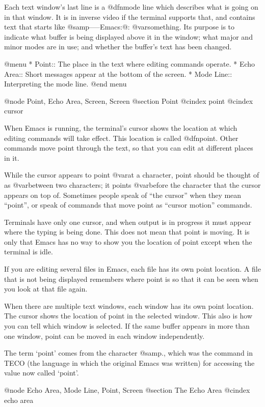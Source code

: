   Each text window's last line is a @dfn{mode line} which describes what is
going on in that window.  It is in inverse video if the terminal supports
that, and contains text that starts like @samp{-----Emacs:@: @var{something}}.  Its
purpose is to indicate what buffer is being displayed above it in the
window; what major and minor modes are in use; and whether the buffer's
text has been changed.

@menu
* Point::	The place in the text where editing commands operate.
* Echo Area::   Short messages appear at the bottom of the screen.
* Mode Line::	Interpreting the mode line.
@end menu

@node Point, Echo Area, Screen, Screen
@section Point
@cindex point
@cindex cursor

  When Emacs is running, the terminal's cursor shows the location at
which editing commands will take effect.  This location is called
@dfn{point}.  Other commands move point through the text, so that you
can edit at different places in it.

  While the cursor appears to point @var{at} a character, point should be
thought of as @var{between} two characters; it points @var{before} the character
that the cursor appears on top of.  Sometimes people speak of ``the
cursor'' when they mean ``point'', or speak of commands that move point as
``cursor motion'' commands.

  Terminals have only one cursor, and when output is in progress it must
appear where the typing is being done.  This does not mean that point is
moving.  It is only that Emacs has no way to show you the location of point
except when the terminal is idle.

  If you are editing several files in Emacs, each file has its own point
location.  A file that is not being displayed remembers where point is so
that it can be seen when you look at that file again.

  When there are multiple text windows, each window has its own point
location.  The cursor shows the location of point in the selected window.
This also is how you can tell which window is selected.  If the same buffer
appears in more than one window, point can be moved in each window
independently.

  The term `point' comes from the character @samp{.}, which was the
command in TECO (the language in which the original Emacs was written)
for accessing the value now called `point'.

@node Echo Area, Mode Line, Point, Screen
@section The Echo Area
@cindex echo area

